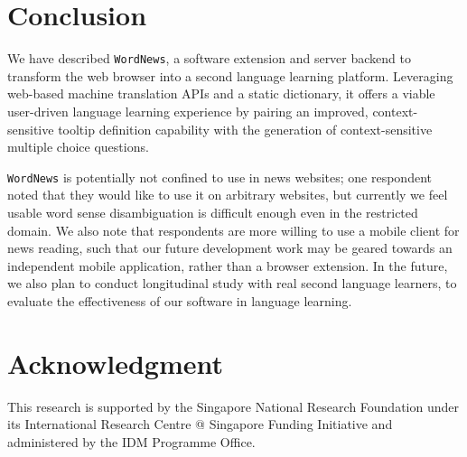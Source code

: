 \section{Conclusion}
\label{sec:conclusion}

We have described {\tt WordNews}, a software extension and server
backend to transform the web browser into a second language learning
platform.  Leveraging web-based machine translation APIs and a static
dictionary, it offers a viable user-driven language learning
experience by pairing an improved, context-sensitive tooltip
definition capability with the generation of context-sensitive
multiple choice questions.


{\tt WordNews} is potentially not confined to use in news websites; one
respondent noted that they would like to use it on arbitrary websites,
but currently we feel usable word sense disambiguation is difficult
enough even in the restricted domain.  We also note that respondents
are more willing to use a mobile client for news reading, such that
our future development work may be geared towards an independent
mobile application, rather than a browser extension. In the future, we also plan to conduct longitudinal study with real second language learners, to evaluate the effectiveness of our software in language learning.

\section*{Acknowledgment}
This research is supported by the Singapore National Research Foundation under its International Research Centre @ Singapore Funding Initiative and administered by the IDM Programme Office.